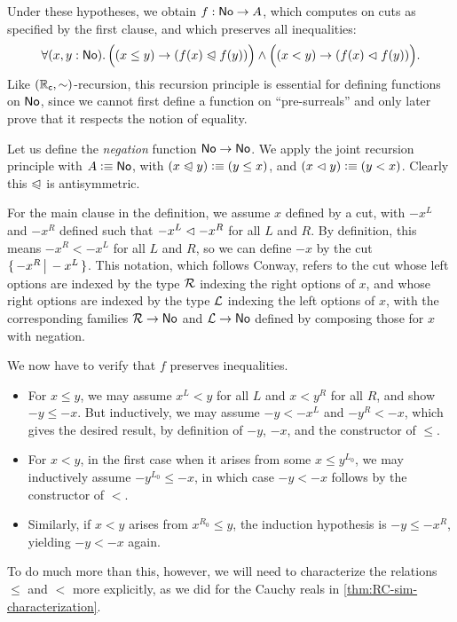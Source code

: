 Under these hypotheses, we obtain $f:\mathsf{No}\to A$, which computes on cuts as specified by the first clause, and which preserves all inequalities:
\[ \fall{x,y:\NO}\Big((x\le y) \to (f(x)\ble f(y))\Big) \land\Big((x< y) \to (f(x)\blt f(y))\Big).\]
Like $(\mathbb{R}_\mathsf{c},\sim)$-recursion, this recursion principle is essential for defining functions on $\mathsf{No}$, since we cannot first define a function on ``pre-surreals'' and only later prove that it respects the notion of equality.

\begin{eg}
  Let us define the \emph{negation} function $\mathsf{No}\to\mathsf{No}$.
  We apply the joint recursion principle with $A\vcentcolon\equiv\mathsf{No}$, with $(x\trianglelefteqslant y)\vcentcolon\equiv (y\le x)$, and $(x\vartriangleleft y)\vcentcolon\equiv (y< x)$.
  Clearly this $\trianglelefteqslant$ is antisymmetric.

  For the main clause in the definition, we assume $x$ defined by a cut, with $-x^L$ and $-x^R$ defined such that $-x^L \vartriangleleft -x^R$ for all $L$ and $R$.
  By definition, this means $-x^R< -x^L$ for all $L$ and $R$, so we can define $-x$ by the cut $\{\,-x^R\,\big|\,-x^L\,\}$.
  This notation, which follows Conway, refers to the cut whose left options are indexed by the type $\mathcal{R}$ indexing the right options of $x$, and whose right options are indexed by the type $\mathcal{L}$ indexing the left options of $x$, with the corresponding families $\mathcal{R}\to\mathsf{No}$ and $\mathcal{L}\to\mathsf{No}$ defined by composing those for $x$ with negation.

  We now have to verify that $f$ preserves inequalities.
  \begin{itemize}
  \item For $x\le y$, we may assume $x^L<y$ for all $L$ and $x < y^R$ for all $R$, and show $-y\le -x$.
    But inductively, we may assume $-y <-x^L$ and $-y^R<-x$, which gives the desired result, by definition of $-y$, $-x$, and the constructor of $\le$.
  \item For $x<y$, in the first case when it arises from some $x\le y^{L_0}$, we may inductively assume $-y^{L_0} \le -x$, in which case $-y<-x$ follows by the constructor of $<$.
  \item Similarly, if $x<y$ arises from $x^{R_0}\le y$, the induction hypothesis is $-y \le -x^R$, yielding $-y<-x$ again.
  \end{itemize}
\end{eg}

To do much more than this, however, we will need to characterize the relations $\le$ and $<$ more explicitly, as we did for the Cauchy reals in \autoref{thm:RC-sim-characterization}.

